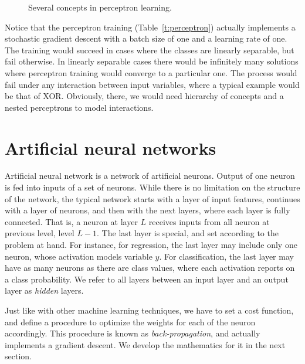 \begin{refsection}
\begin{figure}[htbp]
\caption{Several concepts in perceptron learning.}
\label{fig:perceptron-learning}
\end{figure}

Notice that the perceptron training (Table~\ref{t:perceptron}) actually implements a stochastic gradient descent with a batch size of one and a learning rate of one. The training would succeed in cases where the classes are linearly separable, but fail otherwise. In linearly separable cases there would be infinitely many solutions where perceptron training would converge to a particular one. The process would fail under any interaction between input variables, where a typical example would be that of XOR. Obviously, there, we would need hierarchy of concepts and a nested perceptrons to model interactions.

\section{Artificial neural networks}

Artificial neural network is a network of artificial neurons. Output of one neuron is fed into inputs of a set of neurons. While there is no limitation on the structure of the network, the typical network starts with a layer of input features, continues with a layer of neurons, and then with the next layers, where each layer is fully connected. That is, a neuron at layer $L$ receives inputs from all neuron at previous level, level $L-1$. The last layer is special, and set according to the problem at hand. For instance, for regression, the last layer may include only one neuron, whose activation models variable $y$. For classification, the last layer may have as many neurons as there are class values, where each activation reports on a class probability. We refer to all layers between an input layer and an output layer as {\em hidden} layers.

Just like with other machine learning techniques, we have to set a cost function, and define a procedure to optimize the weights for each of the neuron accordingly. This procedure is known as {\em back-propagation}, and actually implements a gradient descent. We develop the mathematics for it in the next section.


\end{refsection}
